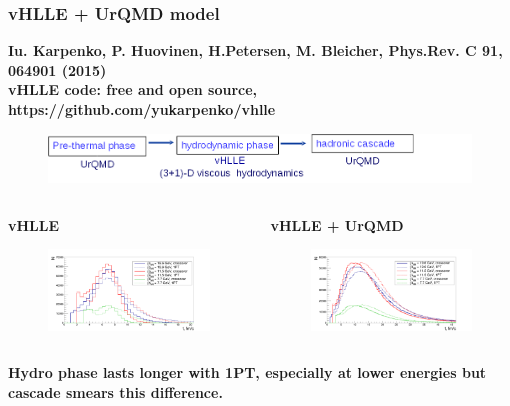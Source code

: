 \documentclass[dvipsnames] {beamer}
\begin{document}
\begin{frame}[shrink=20]
  \frametitle{vHLLE + UrQMD model}
  \begin{block}{{ \bf {\footnotesize Iu. Karpenko, P. Huovinen, H.Petersen, M. Bleicher, Phys.Rev. C 91, 064901 (2015)} \\
    vHLLE code: free and open source, https://github.com/yukarpenko/vhlle}}
    \begin{figure}[H]
      \includegraphics[width=.8\linewidth]{vHLLE.png}
    \end{figure}
  \end{block}
  \begin{columns}[c]
        \begin{block}{\center \footnotesize \bf \alert{vHLLE}}
        \begin{figure}[H]
          \includegraphics[width=.95\linewidth]{vHLLE_tfr.png}
        \end{figure}
     \end{block}
         \begin{block}{\center \footnotesize \bf \alert{vHLLE + UrQMD}}
        \begin{figure}[H]
          \includegraphics[width=.95\linewidth]{vHLLE_UrQMD_tfr.png}
        \end{figure}
     \end{block}
  \end{columns}
    \begin{block}{}
    \bf \centering 
        {\color{red} Hydro phase lasts longer with 1PT, especially at lower energies
          but cascade smears this difference}.
        

\end{block}
\end{frame}
\end{document}
